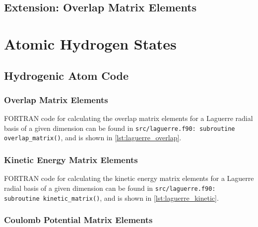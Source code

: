 \documentclass[]{article}
\begin{document}
\subsection{Extension: Overlap Matrix Elements}
\label{sec:extens-overl-matr}


\clearpage
\section{Atomic Hydrogen States}
\label{sec:atom-hydr-stat}

%

\subsection{Hydrogenic Atom Code}
\label{sec:hydrogenic-atom-code}

\subsubsection{Overlap Matrix Elements}
\label{sec:overl-matr-elem}

FORTRAN code for calculating the overlap matrix elements for a Laguerre radial
basis of a given dimension can be found in
\lstinline[style=ff]{src/laguerre.f90: }\lstinline{subroutine overlap_matrix()},
and is shown in \autoref{lst:laguerre_overlap}.



\subsubsection{Kinetic Energy Matrix Elements}
\label{sec:kinet-energy-matr-1}

FORTRAN code for calculating the kinetic energy matrix elements for a Laguerre
radial basis of a given dimension can be found in
\lstinline[style=ff]{src/laguerre.f90: }\lstinline{subroutine kinetic_matrix()},
and is shown in \autoref{lst:laguerre_kinetic}.



\subsubsection{Coulomb Potential Matrix Elements}
\label{sec:coulomb-potential-matr}
\end{document}
